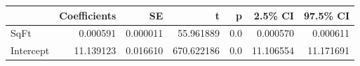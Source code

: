 \begin{tabular}{lrrrrrr}
\toprule
{} &  Coefficients &        SE &           t &    p &    2.5\% CI &   97.5\% CI \\
\midrule
SqFt      &      0.000591 &  0.000011 &   55.961889 &  0.0 &   0.000570 &   0.000611 \\
Intercept &     11.139123 &  0.016610 &  670.622186 &  0.0 &  11.106554 &  11.171691 \\
\bottomrule
\end{tabular}
